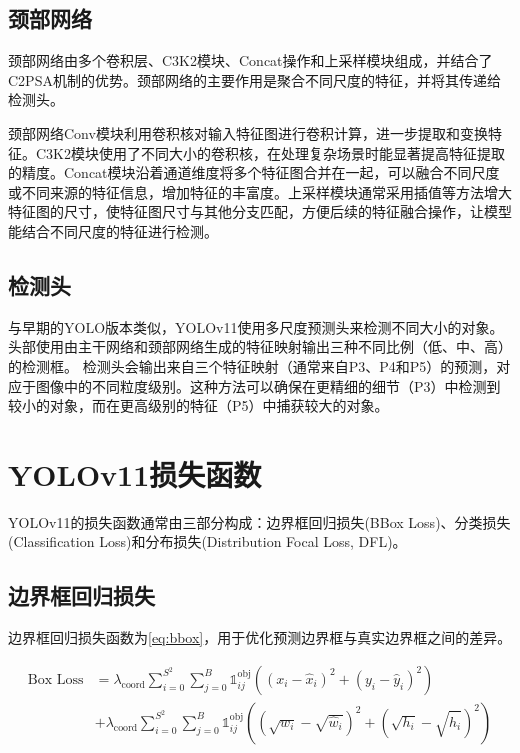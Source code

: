 \subsection{颈部网络}
颈部网络由多个卷积层、C3K2模块、Concat操作和上采样模块组成，并结合了C2PSA机制的优势。颈部网络的主要作用是聚合不同尺度的特征，并将其传递给检测头。

颈部网络Conv模块利用卷积核对输入特征图进行卷积计算，进一步提取和变换特征。C3K2模块使用了不同大小的卷积核，在处理复杂场景时能显著提高特征提取的精度。Concat模块沿着通道维度将多个特征图合并在一起，可以融合不同尺度或不同来源的特征信息，增加特征的丰富度。上采样模块通常采用插值等方法增大特征图的尺寸，使特征图尺寸与其他分支匹配，方便后续的特征融合操作，让模型能结合不同尺度的特征进行检测。

\subsection{检测头}
与早期的YOLO版本类似，YOLOv11使用多尺度预测头来检测不同大小的对象。头部使用由主干网络和颈部网络生成的特征映射输出三种不同比例（低、中、高）的检测框。
检测头会输出来自三个特征映射（通常来自P3、P4和P5）的预测，对应于图像中的不同粒度级别。这种方法可以确保在更精细的细节（P3）中检测到较小的对象，而在更高级别的特征（P5）中捕获较大的对象​。

\section{YOLOv11损失函数}
YOLOv11的损失函数通常由三部分构成：边界框回归损失(BBox Loss)、分类损失(Classification Loss)和分布损失(Distribution Focal Loss, DFL)。

\subsection{边界框回归损失}
边界框回归损失函数为\ref{eq:bbox}，用于优化预测边界框与真实边界框之间的差异。

\begin{equation}
  \begin{aligned}
  \text{Box Loss} &= \lambda_{\text{coord}} \sum_{i = 0}^{S^2} \sum_{j = 0}^{B} \mathbb{1}_{ij}^{\text{obj}} \left( (x_i - \hat{x}_i)^2 + (y_i - \hat{y}_i)^2 \right) \\
  &+ \lambda_{\text{coord}} \sum_{i = 0}^{S^2} \sum_{j = 0}^{B} \mathbb{1}_{ij}^{\text{obj}} \left( (\sqrt{w_i} - \sqrt{\hat{w}_i})^2 + (\sqrt{h_i} - \sqrt{\hat{h}_i})^2 \right) \label{eq:bbox}
  \end{aligned}
\end{equation}

